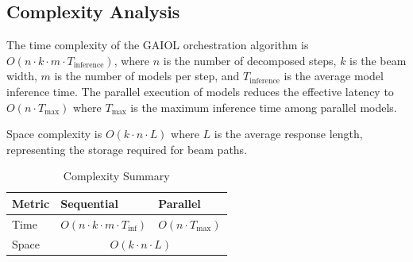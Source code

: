 \subsection{Complexity Analysis}

The time complexity of the GAIOL orchestration algorithm is $O(n \cdot k \cdot m \cdot T_{\text{inference}})$, where $n$ is the number of decomposed steps, $k$ is the beam width, $m$ is the number of models per step, and $T_{\text{inference}}$ is the average model inference time. The parallel execution of models reduces the effective latency to $O(n \cdot T_{\max})$ where $T_{\max}$ is the maximum inference time among parallel models.

Space complexity is $O(k \cdot n \cdot L)$ where $L$ is the average response length, representing the storage required for beam paths.

\begin{table}[h]
\centering
\caption{Complexity Summary}
\label{tab:complexity}
\begin{tabular}{|l|l|l|}
\hline
\textbf{Metric} & \textbf{Sequential} & \textbf{Parallel} \\
\hline
Time & $O(n \cdot k \cdot m \cdot T_{\text{inf}})$ & $O(n \cdot T_{\max})$ \\
\hline
Space & \multicolumn{2}{c|}{$O(k \cdot n \cdot L)$} \\
\hline
\end{tabular}
\end{table}
